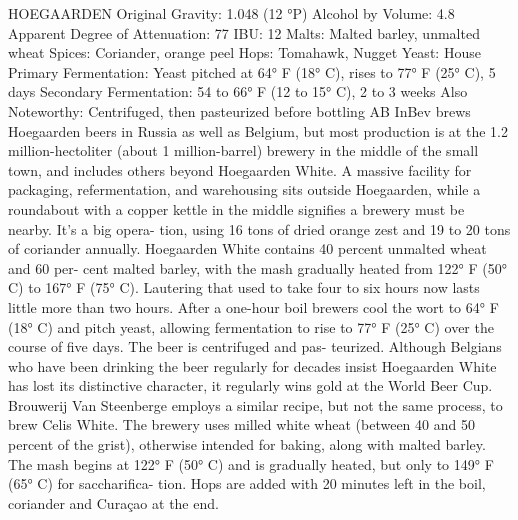\documentclass[a4paper,parskip=half]{scrartcl}
\begin{document}
HOEGAARDEN
Original Gravity: 1.048 (12 °P)
Alcohol by Volume: 4.8%
Apparent Degree of Attenuation: 77%
IBU: 12
Malts: Malted barley, unmalted wheat
Spices: Coriander, orange peel
Hops: Tomahawk, Nugget
Yeast: House
Primary Fermentation: Yeast pitched at 64° F (18° C), rises to 77° F (25° C),
5 days
Secondary Fermentation: 54 to 66° F (12 to 15° C), 2 to 3 weeks
Also Noteworthy: Centrifuged, then pasteurized before bottling
AB InBev brews Hoegaarden beers in Russia as well as Belgium, but
most production is at the 1.2 million-hectoliter (about 1 million-barrel)
brewery in the middle of the small town, and includes others beyond
Hoegaarden White. A massive facility for packaging, refermentation, and
warehousing sits outside Hoegaarden, while a roundabout with a copper
kettle in the middle signifies a brewery must be nearby. It’s a big opera-
tion, using 16 tons of dried orange zest and 19 to 20 tons of coriander
annually.
Hoegaarden White contains 40 percent unmalted wheat and 60 per-
cent malted barley, with the mash gradually heated from 122° F (50° C)
to 167° F (75° C). Lautering that used to take four to six hours now lasts
little more than two hours. After a one-hour boil brewers cool the wort
to 64° F (18° C) and pitch yeast, allowing fermentation to rise to 77°
F (25° C) over the course of five days. The beer is centrifuged and pas-
teurized. Although Belgians who have been drinking the beer regularly
for decades insist Hoegaarden White has lost its distinctive character, it
regularly wins gold at the World Beer Cup.
Brouwerij Van Steenberge employs a similar recipe, but not the
same process, to brew Celis White. The brewery uses milled white
wheat (between 40 and 50 percent of the grist), otherwise intended for
baking, along with malted barley. The mash begins at 122° F (50° C)
and is gradually heated, but only to 149° F (65° C) for saccharifica-
tion. Hops are added with 20 minutes left in the boil, coriander and
Curaçao at the end.

\parencite[52]{Hieronymus2010}
\end{document}
